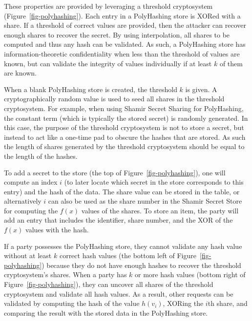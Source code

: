 These properties are provided by leveraging a threshold cryptosystem 
(Figure~\ref{fig-polyhashing}).   Each entry in a PolyHashing store is XORed 
with a share.   If a threshold of correct values are provided, then the 
attacker can recover enough shares to recover the secret.   By using
interpolation, all shares to be computed and thus any hash can be 
validated.  As such, a PolyHashing store has information-theoretic 
confidentiality when 
less than the threshold of values are known, but can validate the 
integrity of values individually if at least $k$ of them are known.


When a blank PolyHashing store is created, the threshold $k$ is given.  
A cryptographically random value is used to seed all shares in the
threshold cryptosystem.  For example, when using Shamir Secret Sharing for 
PolyHashing, the constant term (which is typically the stored secret) is 
randomly generated.   In this case, the purpose of the threshold cryptosystem 
is not to store a secret, but instead to act like a one-time pad to obscure 
the hashes that are stored.   As such the length of shares generated by 
the threshold cryptosystem should be equal to the length of the hashes.


To add a secret to the store (the top of Figure~\ref{fig-polyhashing}), one 
will compute an index $i$ (to 
later locate which secret in the store corresponds to this entry) and
the hash of the data.   The share value can be stored in the table, or
alternatively $i$ can also be used as the 
share number in the Shamir Secret Store for computing the $f(x)$ values of the
shares.   To store an item, the party will add an entry that includes the 
identifier, share number, and the XOR of the $f(x)$ values 
with the hash.   %



If a party possesses the PolyHashing store, they cannot validate any hash 
value without at least $k$ correct hash values (the bottom left of 
Figure~\ref{fig-polyhashing}) because they do not have enough hashes
to recover the threshold
cryptosystem's shares.  When a party has $k$ or more hash 
values (bottom right of Figure~\ref{fig-polyhashing}), they can 
uncover all shares of the threshold cryptosystem and validate all hash
values.   As a result, other requests can be validated by computing
the hash of the value $h(v_i)$, XORing the $i$th share, and
comparing the result with the stored data in the PolyHashing store.

